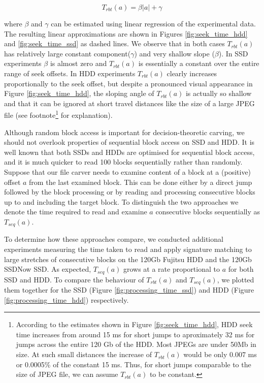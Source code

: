 \documentclass[final,5p,times,twocolumn,authoryear]{elsarticle}
\begin{document}
\begin{equation} \label{eq:tproc-eq}
T_{rbt}(a)=\beta |a|+\gamma
\end{equation}

where $\beta$ and $\gamma$ can be estimated using linear regression of the experimental data. The resulting linear approximations are shown in Figures \ref{fig:seek_time_hdd} and \ref{fig:seek_time_ssd} as dashed lines. We observe that in both cases $T_{rbt}(a)$ has relatively large constant component($\gamma$) and very shallow slope ($\beta$). In SSD experiments $\beta$ is almost zero and $T_{rbt}(a)$ is essentially a constant over the entire range of seek offsets. In HDD experiments $T_{rbt}(a)$ clearly increases proportionally to the seek offset, but despite a pronounced visual appearance in Figure \ref{fig:seek_time_hdd}, the sloping angle of $T_{rbt}(a)$ is actually so shallow and that it can be ignored at short travel distances like the size of a large JPEG file (see footnote\footnote{According to the estimates shown in Figure \ref{fig:seek_time_hdd}, HDD seek time increases from around 15 ms for short jumps to aproximately 32 ms for jumps across the entire 120 Gb of the HDD. Most JPEGs are under 50Mb in size. At such small distances the increase of $T_{rbt}(a)$ would be only 0.007 ms or 0.0005\% of the constant 15 ms. Thus, for short jumps comparable to the size of JPEG file, we can assume $T_{rbt}(a)$ to be constant.} for explanation).

Although random block access is important for decision-theoretic carving, we should not overlook properties of sequential block access on SSD and HDD. It is well known that both SSDs and HDDs are optimised for sequential block access, and it is much quicker to read 100 blocks sequentially rather than randomly. Suppose that our file carver needs to examine content of a block at a (positive) offset $a$ from the last examined block. This can be done either by a direct jump followed by the block processing or by reading and processing consecutive blocks up to and including the target block. To distinguish the two approaches we denote the time required to read and examine $a$ consecutive blocks sequentially as $T_{seq}(a)$.

To determine how these approaches compare, we conducted additional experiments measuring the time taken to read and apply signature matching to large stretches of consecutive blocks on the 120Gb Fujitsu HDD and the 120Gb SSDNow SSD. As expected, $T_{seq}(a)$ grows at a rate proportional to $a$ for both SSD and HDD. To compare the behaviour of $T_{rbt}(a)$ and $T_{seq}(a)$, we plotted them together for the SSD (Figure \ref{fig:processing_time_ssd}) and HDD (Figure \ref{fig:processing_time_hdd}) respectively. 
\end{document}

